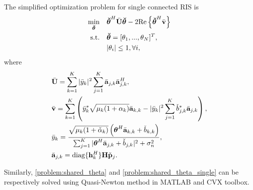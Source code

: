 

The simplified optimization problem for single connected RIS is
\begin{subequations} \label{problem:shared_theta_single}
    \begin{align}
        \min_{\boldsymbol{\breve \theta}} \quad & \boldsymbol{\breve \theta}^H \bar{\bf U} \boldsymbol{\breve \theta} - 2 \mathrm{Re} \left\{ \boldsymbol{\breve \theta}^H \bar{\bf v} \right\}\\  
        \mathrm{s.t.} \quad &  \boldsymbol{\breve \theta} = [\theta_1,...,\theta_N]^T,
        \\ &|\theta_i| \leq 1, \forall i,
    \end{align}
\end{subequations}
where 
\begin{align}
    &\bar{\bf U} = \sum_{k=1}^K |\bar{y}_k|^2 \sum_{j=1}^K \bar{\bf a}_{j,k} \bar{\bf a}_{j,k}^H,  \\
    &\bar{\bf v} = \sum_{k=1}^K \left( \bar{y}_k^* \sqrt{\mu_k(1+\alpha_k)} \bar{\bf a}_{k,k} - |\bar{y}_k|^2  \sum_{j=1}^K \check{b}_{j,k}^* \bar{\bf a}_{j,k} \right), \\
    \label{eqn:shared_optimal_y_single}
    &\bar{y}_k = \frac{\sqrt{\mu_k (1+\check{\alpha}_k)} \left(\boldsymbol{\theta}^H \bar{\bf a}_{k,k} + \check{b}_{k,k} \right)}{\sum_{j=1}^K |\boldsymbol{\theta}^H \bar{\bf a}_{j,k} + \check{b}_{j,k}|^2  + \sigma_n^2}, \\
    &\bar{\bf{a}}_{j,k}=\mathrm{diag}\{\mathbf{h}_k^H\} \mathbf{H} \check{\mathbf{p}}_j. 
\end{align}

Similarly, \eqref{problem:shared_theta} and \eqref{problem:shared_theta_single} can be respectively solved using Quasi-Newton method in MATLAB and CVX toolbox. 

